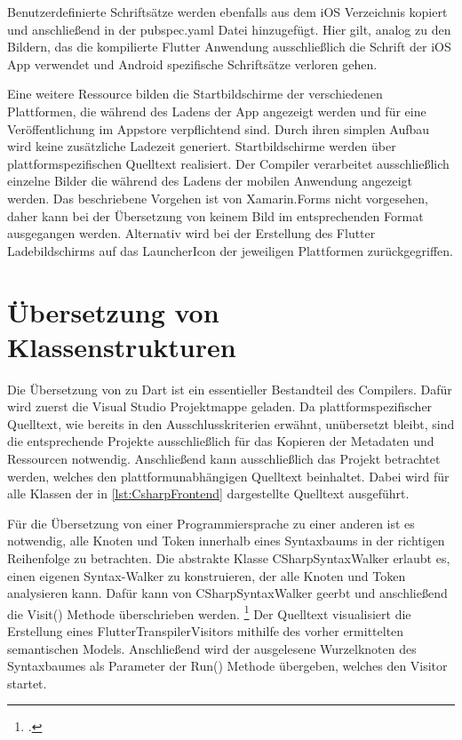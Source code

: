  


Benutzerdefinierte Schriftsätze werden ebenfalls aus dem iOS Verzeichnis kopiert und anschließend in der pubspec.yaml Datei hinzugefügt.  Hier gilt,  analog zu den Bildern,  das die kompilierte Flutter Anwendung ausschließlich die Schrift der iOS App verwendet und Android spezifische Schriftsätze verloren gehen.

Eine weitere Ressource bilden die Startbildschirme der verschiedenen Plattformen,  die während des Ladens der App angezeigt werden und für eine Veröffentlichung im Appstore verpflichtend sind.  Durch ihren simplen Aufbau wird keine zusätzliche Ladezeit generiert.  Startbildschirme werden über plattformspezifischen Quelltext realisiert.   Der Compiler verarbeitet ausschließlich einzelne Bilder die während des Ladens der mobilen Anwendung angezeigt werden.  Das beschriebene Vorgehen ist von Xamarin.Forms nicht vorgesehen, daher kann bei der Übersetzung von keinem Bild im entsprechenden Format ausgegangen werden. Alternativ wird bei der Erstellung des Flutter Ladebildschirms auf das LauncherIcon der jeweiligen Plattformen zurückgegriffen.  

\section{Übersetzung von Klassenstrukturen}

Die Übersetzung von \Csharp zu Dart ist ein essentieller Bestandteil des Compilers.  Dafür wird zuerst die Visual Studio Projektmappe geladen.  Da plattformspezifischer Quelltext, wie bereits in den Ausschlusskriterien erwähnt, unübersetzt bleibt, sind die entsprechende Projekte ausschließlich für das Kopieren der Metadaten und 
Ressourcen notwendig.  Anschließend kann ausschließlich das Projekt betrachtet werden, welches den plattformunabhängigen Quelltext beinhaltet.  Dabei wird für alle Klassen der in  \ref{lst:CsharpFrontend} dargestellte Quelltext ausgeführt. 

Für die Übersetzung von einer Programmiersprache zu einer anderen ist es notwendig,  alle Knoten und Token innerhalb eines Syntaxbaums in der richtigen Reihenfolge zu betrachten.  Die abstrakte Klasse \glq CSharpSyntaxWalker\grq{} erlaubt es,  einen eigenen \glq Syntax-Walker\grq{} zu konstruieren,  der alle Knoten und Token analysieren kann.  Dafür kann von \glq CSharpSyntaxWalker\grq{} geerbt und anschließend die \glq Visit()\grq{} Methode überschrieben werden.  \footcite[Vgl.][Abgerufen am \today]{Varty2014}  Der Quelltext visualisiert die Erstellung eines \glq FlutterTranspilerVisitors\grq{} mithilfe des vorher ermittelten semantischen Models.  Anschließend wird der ausgelesene Wurzelknoten des Syntaxbaumes als Parameter der \glq Run()\grq{} Methode übergeben, welches den \glq Visitor\grq{} startet.  

